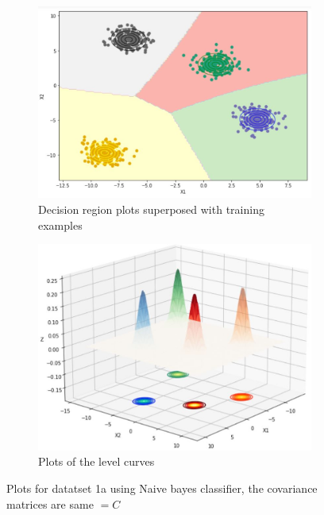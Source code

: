 \documentclass[11pt]{article}
\begin{document}
\begin{figure}[h]
\centering
	\begin{subfigure}[b]{0.45\textwidth}
	\centering
	\includegraphics[scale=0.3]{dataset1a_sameC_nb_2D.jpg}
	\caption{Decision region plots superposed with training examples}
	\label{fig:fig2.2.3.1}
	\end{subfigure}
	\hfill
	\begin{subfigure}[b]{0.45\textwidth}
	\centering
	\includegraphics[scale=0.3]{dataset1a_sameC_nb_3D.jpg}
	\caption{Plots of the level curves}
	\label{fig:fig2.2.3.2}
	\end{subfigure}
\caption{Plots for datatset 1a using Naive bayes classifier, the covariance matrices are same $= C$ }
\label{fig:fig1.2.1}
\end{figure}
\end{document}
